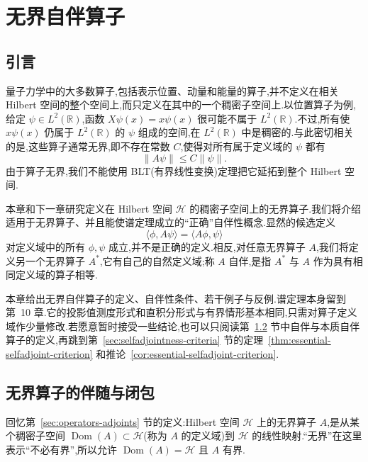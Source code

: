 \chapter{无界自伴算子}
\label{chap:unbounded-selfadjoint}

\section{引言}
\label{sec:unbounded-introduction}

量子力学中的大多数算子,包括表示位置、动量和能量的算子,并不定义在相关 Hilbert 空间的整个空间上,而只定义在其中的一个稠密子空间上.以位置算子为例,给定 \(\psi\in L^{2}(\mathbb{R})\),函数 \(X\psi(x)=x\psi(x)\) 很可能不属于 \(L^{2}(\mathbb{R})\).不过,所有使 \(x\psi(x)\) 仍属于 \(L^{2}(\mathbb{R})\) 的 \(\psi\) 组成的空间,在 \(L^{2}(\mathbb{R})\) 中是稠密的.与此密切相关的是,这些算子通常无界,即不存在常数 \(C\),使得对所有属于定义域的 \(\psi\) 都有
\[
\|A\psi\|\leq C\|\psi\|.
\]
由于算子无界,我们不能使用 BLT(有界线性变换)定理把它延拓到整个 Hilbert 空间.

本章和下一章研究定义在 Hilbert 空间 \(\mathcal{H}\) 的稠密子空间上的无界算子.我们将介绍适用于无界算子、并且能使谱定理成立的“正确”自伴性概念.显然的候选定义
\[
\langle\phi,A\psi\rangle=\langle A\phi,\psi\rangle
\]
对定义域中的所有 \(\phi,\psi\) 成立,并不是正确的定义.相反,对任意无界算子 \(A\),我们将定义另一个无界算子 \(A^{*}\),它有自己的自然定义域;称 \(A\) 自伴,是指 \(A^{*}\) 与 \(A\) 作为具有相同定义域的算子相等.

本章给出无界自伴算子的定义、自伴性条件、若干例子与反例.谱定理本身留到第~10 章.它的投影值测度形式和直积分形式与有界情形基本相同,只需对算子定义域作少量修改.若愿意暂时接受一些结论,也可以只阅读第~\ref{sec:adjoint-closure} 节中自伴与本质自伴算子的定义,再跳到第~\ref{sec:selfadjointness-criteria} 节的定理~\ref{thm:essential-selfadjoint-criterion} 和推论~\ref{cor:essential-selfadjoint-criterion}.

\section{无界算子的伴随与闭包}
\label{sec:adjoint-closure}

回忆第~\ref{sec:operators-adjoints} 节的定义:Hilbert 空间 \(\mathcal{H}\) 上的无界算子 \(A\),是从某个稠密子空间 \(\operatorname{Dom}(A)\subset\mathcal{H}\)(称为 \(A\) 的定义域)到 \(\mathcal{H}\) 的线性映射.“无界”在这里表示“不必有界”,所以允许 \(\operatorname{Dom}(A)=\mathcal{H}\) 且 \(A\) 有界.

